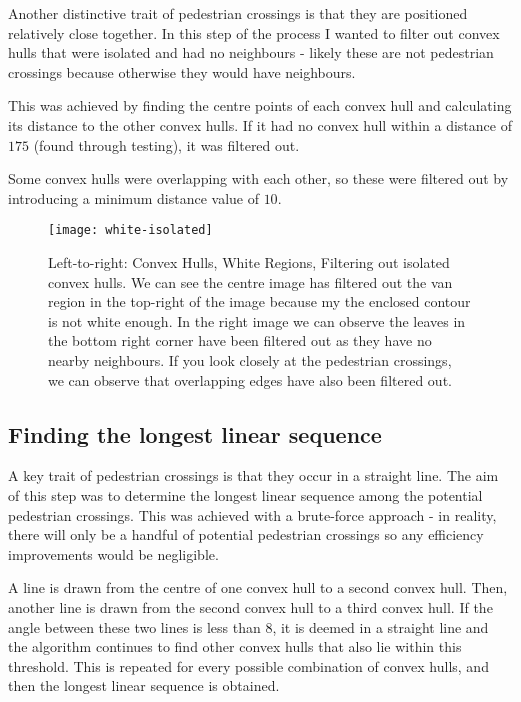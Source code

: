 \documentclass{article}  %
\begin{document}
	Another distinctive trait of pedestrian crossings is that they are positioned relatively close together. In this step of the process I wanted to filter out convex hulls that were isolated and had no neighbours - likely these are not pedestrian crossings because otherwise they would have neighbours.
	
	This was achieved by finding the centre points of each convex hull and calculating its distance to the other convex hulls. If it had no convex hull within a distance of $175$ (found through testing), it was filtered out.
	
	Some convex hulls were overlapping with each other, so these were filtered out by introducing a minimum distance value of $10$.
	
	\begin{figure}[H]
		\centering
		\texttt{[image: white-isolated]}
		\caption{Left-to-right: Convex Hulls, White Regions, Filtering out isolated convex hulls. We can see the centre image has filtered out the van region in the top-right of the image because my the enclosed contour is not white enough. In the right image we can observe the leaves in the bottom right corner have been filtered out as they have no nearby neighbours. If you look closely at the pedestrian crossings, we can observe that overlapping edges have also been filtered out.}
	\end{figure}
	
	\subsection{Finding the longest linear sequence}\label{longest-linear-sequence}
	
	A key trait of pedestrian crossings is that they occur in a straight line. The aim of this step was to determine the longest linear sequence among the potential pedestrian crossings. This was achieved with a brute-force approach - in reality, there will only be a handful of potential pedestrian crossings so any efficiency improvements would be negligible.
	
	A line is drawn from the centre of one convex hull to a second convex hull. Then, another line is drawn from the second convex hull to a third convex hull. If the angle between these two lines is less than $8$\textdegree, it is deemed in a straight line and the algorithm continues to find other convex hulls that also lie within this threshold. This is repeated for every possible combination of convex hulls, and then the longest linear sequence is obtained.
	
\end{document}
